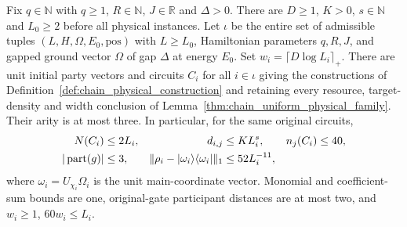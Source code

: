 \begin{lemma}
    \label{thm:chain_physical_sharp_sampled_crossings}
    \leanok
    Fix $q\in\mathbb N$ with $q\ge1$, $R\in\mathbb N$,
    $J\in\mathbb R$ and $\Delta>0$.
    There are $D\ge1$, $K>0$, $s\in\mathbb N$ and $L_0\ge2$
    before all physical instances. Let $\iota$ be the entire set
    of admissible tuples $(L,H,\Omega,E_0,\mathrm{pos})$ with
    $L\ge L_0$, Hamiltonian parameters $q,R,J$, and gapped
    ground vector $\Omega$ of gap $\Delta$ at energy $E_0$.
    Set $w_i=\lceil D\log L_i\rceil_+$.
    There are unit initial party vectors and circuits $C_i$ for
    all $i\in\iota$ giving the constructions of
    Definition~\ref{def:chain_physical_construction} and retaining
    every resource, target-density and width conclusion of
    Lemma~\ref{thm:chain_uniform_physical_family}.
    Their arity is at most three.
    In particular, for the same original circuits,
    \begin{align}
        N(C_i)                                        & \le2L_i,        & d_{i,j} & \le KL_i^s, & n_j(C_i) & \le40,\notag \\
        |\operatorname{part}(g)|                      & \le3,           &
        \|\rho_i-|\omega_i\rangle\langle\omega_i|\|_1 & \le52L_i^{-11},
        \label{eq:chain_sharp_physical_inputs}
    \end{align}
    where $\omega_i=U_{\chi_i}\Omega_i$ is the unit
    main-coordinate vector. Monomial and coefficient-sum bounds are one,
    original-gate participant distances are at most two, and
    $w_i\ge1$, $60w_i\le L_i$.


\end{lemma}
